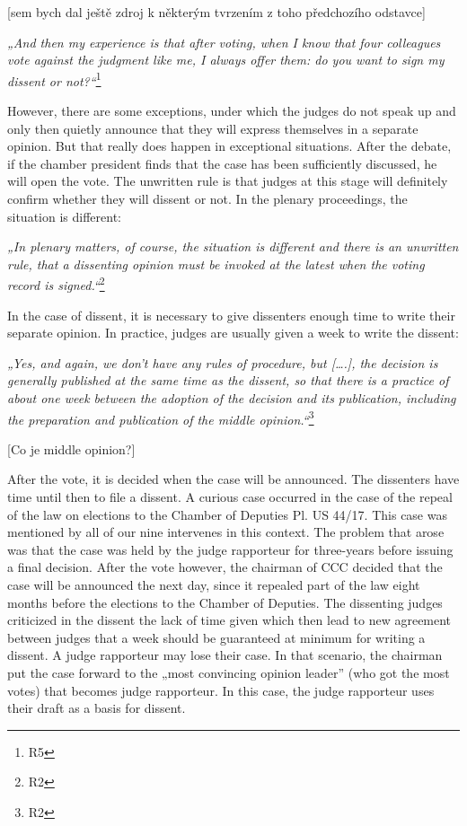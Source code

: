 \documentclass[
  11pt,
]{article}
\begin{document}
{[}sem bych dal ještě zdroj k některým tvrzením z toho předchozího odstavce{]}

\emph{„And then my experience is that after voting, when I know that four colleagues vote against the judgment like me, I always offer them: do you want to sign my dissent or not?{}``}\footnote{R5}

However, there are some exceptions, under which the judges do not speak up and only then quietly announce that they will express themselves in a separate opinion. But that really does happen in exceptional situations. After the debate, if the chamber president finds that the case has been sufficiently discussed, he will open the vote. The unwritten rule is that judges at this stage will definitely confirm whether they will dissent or not. In the plenary proceedings, the situation is different:

\emph{„In plenary matters, of course, the situation is different and there is an unwritten rule, that a dissenting opinion must be invoked at the latest when the voting record is signed.``}\footnote{R2}

In the case of dissent, it is necessary to give dissenters enough time to write their separate opinion. In practice, judges are usually given a week to write the dissent:

\emph{„Yes, and again, we don't have any rules of procedure, but {[}\ldots.{]}, the decision is generally published at the same time as the dissent, so that there is a practice of about one week between the adoption of the decision and its publication, including the preparation and publication of the middle opinion.``}\footnote{R2}

{[}Co je middle opinion?{]}

After the vote, it is decided when the case will be announced. The dissenters have time until then to file a dissent. A curious case occurred in the case of the repeal of the law on elections to the Chamber of Deputies Pl. US 44/17. This case was mentioned by all of our nine intervenes in this context. The problem that arose was that the case was held by the judge rapporteur for three-years before issuing a final decision. After the vote however, the chairman of CCC decided that the case will be announced the next day, since it repealed part of the law eight months before the elections to the Chamber of Deputies. The dissenting judges criticized in the dissent the lack of time given which then lead to new agreement between judges that a week should be guaranteed at minimum for writing a dissent. A judge rapporteur may lose their case. In that scenario, the chairman put the case forward to the „most convincing opinion leader'' (who got the most votes) that becomes judge rapporteur. In this case, the judge rapporteur uses their draft as a basis for dissent.
\end{document}
